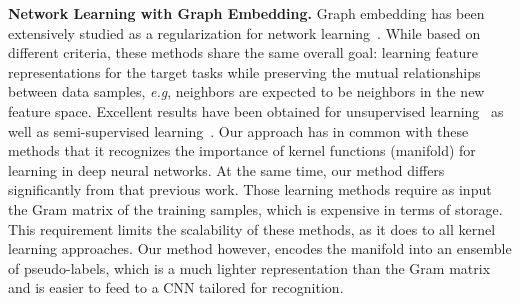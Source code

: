 \documentclass{bmvc2k}
\def\eg{\emph{e.g}\bmvaOneDot}
\begin{document}
\noindent
\textbf{Network Learning with Graph Embedding.} 
Graph embedding has been extensively studied as a regularization for network learning~\cite{Weston:2008,deep:kernel:reg:09, manifold:cnn:14, revisiting:semi_graph}. While based on different criteria, these methods share the same overall goal: learning feature representations for the target tasks while preserving the mutual relationships between data samples, \eg, neighbors are expected to be neighbors in the new feature space. Excellent results have been obtained for unsupervised learning~\cite{hadsell2006dimensionality} as well as semi-supervised learning~\cite{Weston:2008,revisiting:semi_graph}.
Our approach has in common with these methods that it recognizes the
importance of kernel functions (manifold) for learning in deep neural
networks. At the same time, our method differs significantly from that
previous work. Those learning methods require as input the Gram matrix 
of the training samples, which is expensive in terms of storage. This 
requirement limits the scalability of these methods, as it does to all 
kernel learning approaches. Our method however, encodes the manifold 
into an ensemble of pseudo-labels, which is a much lighter representation
than the Gram matrix and is easier to feed to a CNN tailored for recognition.
\end{document}
